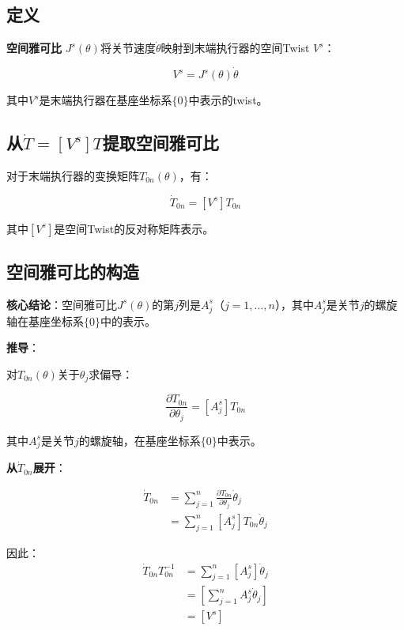 \documentclass[12pt,a4paper]{article}
\begin{document}
\subsection{定义}

\textbf{空间雅可比} $J^s(\theta)$将关节速度$\dot{\theta}$映射到末端执行器的空间Twist $V^s$：

\begin{equation}
V^s = J^s(\theta) \dot{\theta}
\label{eq:space_jacobian_def}
\end{equation}

其中$V^s$是末端执行器在基座坐标系$\{0\}$中表示的twist。

\subsection{从$\dot{T} = [V^s]T$提取空间雅可比}

对于末端执行器的变换矩阵$T_{0n}(\theta)$，有：

\begin{equation}
\dot{T}_{0n} = [V^s] T_{0n}
\label{eq:T_dot_space}
\end{equation}

其中$[V^s]$是空间Twist的反对称矩阵表示。

\subsection{空间雅可比的构造}

\textbf{核心结论}：空间雅可比$J^s(\theta)$的第$j$列是$A_j^s$（$j = 1, \ldots, n$），其中$A_j^s$是关节$j$的螺旋轴在基座坐标系$\{0\}$中的表示。

\textbf{推导}：

对$T_{0n}(\theta)$关于$\theta_j$求偏导：

\begin{equation}
\frac{\partial T_{0n}}{\partial \theta_j} = [A_j^s] T_{0n}
\label{eq:partial_T_space}
\end{equation}

其中$A_j^s$是关节$j$的螺旋轴，在基座坐标系$\{0\}$中表示。

\textbf{从$\dot{T}_{0n}$展开}：

\begin{align}
\dot{T}_{0n} &= \sum_{j=1}^{n} \frac{\partial T_{0n}}{\partial \theta_j} \dot{\theta}_j \\
&= \sum_{j=1}^{n} [A_j^s] T_{0n} \dot{\theta}_j
\end{align}

因此：
\begin{align}
\dot{T}_{0n} T_{0n}^{-1} &= \sum_{j=1}^{n} [A_j^s] \dot{\theta}_j \\
&= \left[ \sum_{j=1}^{n} A_j^s \dot{\theta}_j \right] \\
&= [V^s]
\end{align}
\end{document}
